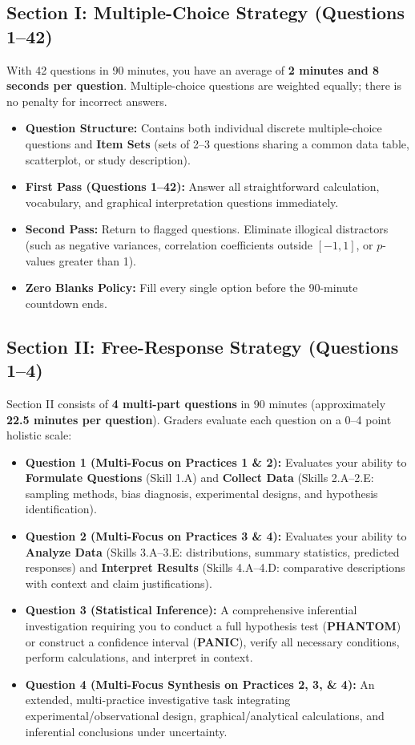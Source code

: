\subsection*{Section I: Multiple-Choice Strategy (Questions 1--42)}
With 42 questions in 90 minutes, you have an average of \textbf{2 minutes and 8 seconds per question}. Multiple-choice questions are weighted equally; there is no penalty for incorrect answers.
\begin{itemize}[leftmargin=1.5em]
  \item \textbf{Question Structure:} Contains both individual discrete multiple-choice questions and \textbf{Item Sets} (sets of 2--3 questions sharing a common data table, scatterplot, or study description).
  \item \textbf{First Pass (Questions 1--42):} Answer all straightforward calculation, vocabulary, and graphical interpretation questions immediately.
  \item \textbf{Second Pass:} Return to flagged questions. Eliminate illogical distractors (such as negative variances, correlation coefficients outside $[-1, 1]$, or $p$-values greater than 1).
  \item \textbf{Zero Blanks Policy:} Fill every single option before the 90-minute countdown ends.
\end{itemize}

\subsection*{Section II: Free-Response Strategy (Questions 1--4)}
Section II consists of \textbf{4 multi-part questions} in 90 minutes (approximately \textbf{22.5 minutes per question}). Graders evaluate each question on a 0--4 point holistic scale:
\begin{itemize}[leftmargin=1.5em]
  \item \textbf{Question 1 (Multi-Focus on Practices 1 \& 2):} Evaluates your ability to \textbf{Formulate Questions} (Skill 1.A) and \textbf{Collect Data} (Skills 2.A--2.E: sampling methods, bias diagnosis, experimental designs, and hypothesis identification).
  \item \textbf{Question 2 (Multi-Focus on Practices 3 \& 4):} Evaluates your ability to \textbf{Analyze Data} (Skills 3.A--3.E: distributions, summary statistics, predicted responses) and \textbf{Interpret Results} (Skills 4.A--4.D: comparative descriptions with context and claim justifications).
  \item \textbf{Question 3 (Statistical Inference):} A comprehensive inferential investigation requiring you to conduct a full hypothesis test (\textbf{PHANTOM}) or construct a confidence interval (\textbf{PANIC}), verify all necessary conditions, perform calculations, and interpret in context.
  \item \textbf{Question 4 (Multi-Focus Synthesis on Practices 2, 3, \& 4):} An extended, multi-practice investigative task integrating experimental/observational design, graphical/analytical calculations, and inferential conclusions under uncertainty.
\end{itemize}

